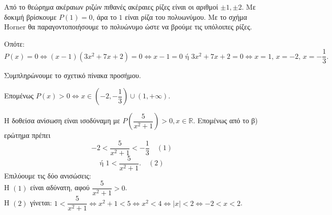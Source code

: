 \begin{alist}
\item Από το θεώρημα ακέραιων ριζών πιθανές ακέραιες ρίζες είναι οι αριθμοί $\pm 1, \pm 2$. Με δοκιμή βρίσκουμε $P(1) = 0$, άρα το $1$ είναι ρίζα του πολυωνύμου. Με το σχήμα Horner θα παραγοντοποιήσουμε το πολυώνυμο ώστε να βρούμε τις υπόλοιπες ρίζες.
\begin{center}
\end{center}
Οπότε:
\[P(x) = 0 \Leftrightarrow (x-1)(3x^2+7x+2) = 0 \Leftrightarrow x-1=0 \text{ ή } 3x^2+7x+2=0 \Leftrightarrow x=1, \, x=-2, \, x=-\frac{1}{3}.\]
\item Συμπληρώνουμε το σχετικό πίνακα προσήμου.
\begin{center}
\end{center}
Επομένως $P(x) > 0 \Leftrightarrow x \in \left(-2, -\dfrac{1}{3}\right) \cup (1, +\infty)$.
\item Η δοθείσα ανίσωση είναι ισοδύναμη με $P\left(\dfrac{5}{x^2+1}\right) > 0, x \in \mathbb{R}$. Επομένως από το β) ερώτημα πρέπει 
\[-2 < \frac{5}{x^2+1} < -\frac{1}{3} \quad (1)\]
\[\text{ή } 1 < \frac{5}{x^2+1}. \quad (2)\]
Επιλύουμε τις δύο ανισώσεις: \\
Η $(1)$ είναι αδύνατη, αφού $\dfrac{5}{x^2+1} > 0$. \\
Η $(2)$ γίνεται: $1 < \dfrac{5}{x^2+1} \Leftrightarrow x^2+1 < 5 \Leftrightarrow x^2 < 4 \Leftrightarrow |x| < 2 \Leftrightarrow -2 < x < 2$.
\end{alist}

